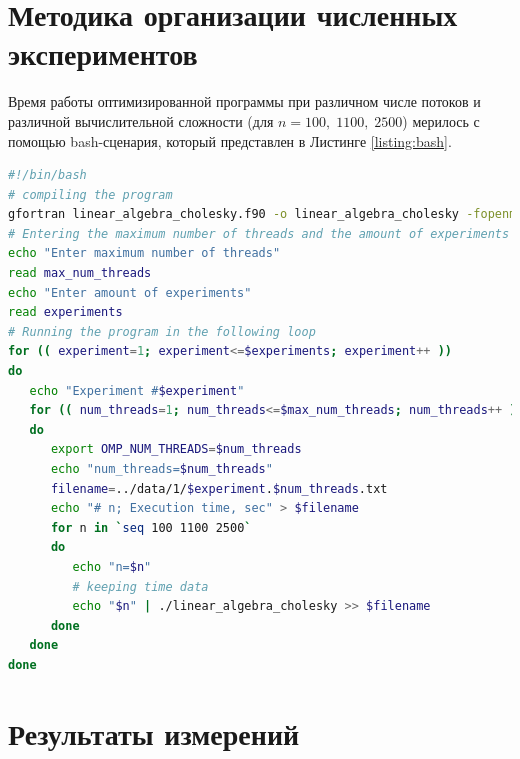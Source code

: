 \documentclass[12pt]{article}
\begin{document}
\section{Методика организации численных экспериментов}

Время работы оптимизированной программы при различном числе потоков и различной вычислительной сложности (для $n=100,\; 1100,\; 2500$) мерилось с помощью bash-сценария, который представлен в Листинге \ref{listing:bash}.
\begin{lstlisting}[language=bash, style=fortran, caption={Сценарий запуска численных экспериментов на языке bash.}, label={listing:bash}]
#!/bin/bash
# compiling the program
gfortran linear_algebra_cholesky.f90 -o linear_algebra_cholesky -fopenmp
# Entering the maximum number of threads and the amount of experiments
echo "Enter maximum number of threads"
read max_num_threads
echo "Enter amount of experiments"
read experiments
# Running the program in the following loop
for (( experiment=1; experiment<=$experiments; experiment++ ))
do
   echo "Experiment #$experiment"
   for (( num_threads=1; num_threads<=$max_num_threads; num_threads++ ))
   do
      export OMP_NUM_THREADS=$num_threads
      echo "num_threads=$num_threads"
      filename=../data/1/$experiment.$num_threads.txt
      echo "# n; Execution time, sec" > $filename
      for n in `seq 100 1100 2500`
      do
         echo "n=$n"
         # keeping time data
         echo "$n" | ./linear_algebra_cholesky >> $filename
      done
   done
done    
\end{lstlisting}

\section{Результаты измерений}
\end{document}
